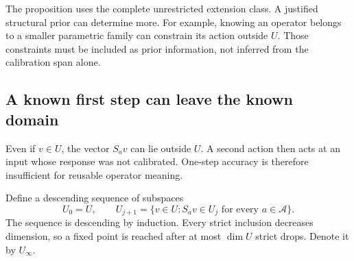 \documentclass[11pt,letterpaper]{article}
\theoremstyle{plain}
\theoremstyle{definition}
\newcommand{\A}{\mathcal A}\newcommand{\C}{\mathcal C}\newcommand{\E}{\mathcal E}
\begin{document}
The proposition uses the complete unrestricted extension class. A justified structural prior can determine more. For example, knowing an operator belongs to a smaller parametric family can constrain its action outside $U$. Those constraints must be included as prior information, not inferred from the calibration span alone.

\subsection{A known first step can leave the known domain}
Even if $v\in U$, the vector $S_av$ can lie outside $U$. A second action then acts at an input whose response was not calibrated. One-step accuracy is therefore insufficient for reusable operator meaning.

Define a descending sequence of subspaces
\[
U_0=U,\qquad
U_{j+1}=\{v\in U:S_av\in U_j\text{ for every }a\in\A\}.\tag{7}
\]
The sequence is descending by induction. Every strict inclusion decreases dimension, so a fixed point is reached after at most $\dim U$ strict drops. Denote it by $U_\infty$.
\end{document}
